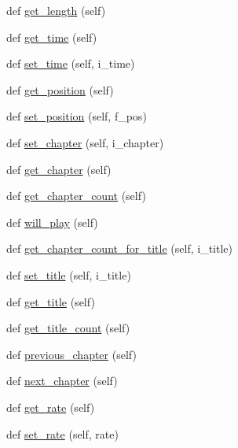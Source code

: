 \begin{DoxyCompactItemize}
def \hyperlink{classvlc_1_1_media_player_acbd51aed7cd34182d1489390bf607caf}{get\+\_\+length} (self)
\item 
def \hyperlink{classvlc_1_1_media_player_a1d6ad4954dd4e8488d5cc7dcfceb2faa}{get\+\_\+time} (self)
\item 
def \hyperlink{classvlc_1_1_media_player_a198f3296982fe799ca6de5e727550163}{set\+\_\+time} (self, i\+\_\+time)
\item 
def \hyperlink{classvlc_1_1_media_player_a17e5bc839e5dae9b73b8454fed5c216c}{get\+\_\+position} (self)
\item 
def \hyperlink{classvlc_1_1_media_player_a2f2e4eb910de57ea727afd175c2c67e3}{set\+\_\+position} (self, f\+\_\+pos)
\item 
def \hyperlink{classvlc_1_1_media_player_a8f1cc1f22ccb1a6f6d592782538decf3}{set\+\_\+chapter} (self, i\+\_\+chapter)
\item 
def \hyperlink{classvlc_1_1_media_player_a61aac7a7f6bf0a4765bc9ca4e53ab1a6}{get\+\_\+chapter} (self)
\item 
def \hyperlink{classvlc_1_1_media_player_a2e2abfffa1b82c0cf09b870524e0b274}{get\+\_\+chapter\+\_\+count} (self)
\item 
def \hyperlink{classvlc_1_1_media_player_a8e7441d35e342d865d4d5e2c75977443}{will\+\_\+play} (self)
\item 
def \hyperlink{classvlc_1_1_media_player_ab4564aebe511a4ab75ece367203bfbdf}{get\+\_\+chapter\+\_\+count\+\_\+for\+\_\+title} (self, i\+\_\+title)
\item 
def \hyperlink{classvlc_1_1_media_player_a21cfaebe83eae792ac9898aa5c40045f}{set\+\_\+title} (self, i\+\_\+title)
\item 
def \hyperlink{classvlc_1_1_media_player_a49f200bc32e91377ec9f649ddda7bb5b}{get\+\_\+title} (self)
\item 
def \hyperlink{classvlc_1_1_media_player_a46b1e4f7e089120a2f0b7ef16cb1306b}{get\+\_\+title\+\_\+count} (self)
\item 
def \hyperlink{classvlc_1_1_media_player_aeab748e2d6ccb4b1fe101585b682a359}{previous\+\_\+chapter} (self)
\item 
def \hyperlink{classvlc_1_1_media_player_a0dfd349d09abc14a2a49c0ff66761fc7}{next\+\_\+chapter} (self)
\item 
def \hyperlink{classvlc_1_1_media_player_ad1385ad1f285068608d077b325909d30}{get\+\_\+rate} (self)
\item 
def \hyperlink{classvlc_1_1_media_player_ad50cf98b830498f40d70c8073683fedf}{set\+\_\+rate} (self, rate)
\item 

\end{DoxyCompactItemize}
